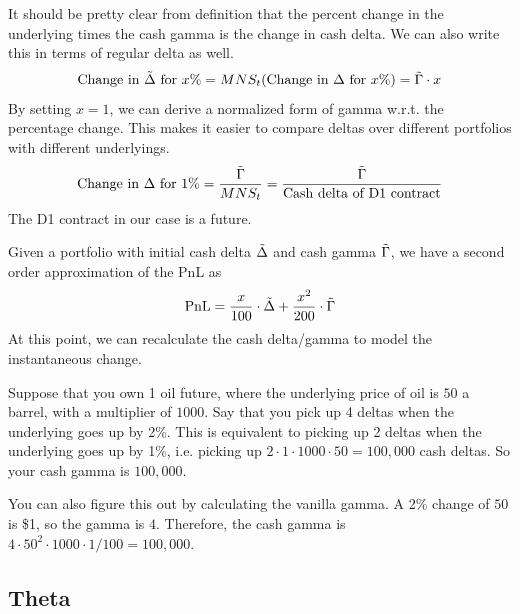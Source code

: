 \documentclass{article}
\begin{document}
    \begin{theorem}
      It should be pretty clear from definition that the percent change in the underlying times the cash gamma is the change in cash delta. We can also write this in terms of regular delta as well. 
      \begin{equation}
        \text{Change in } \Tilde{\Delta} \text{ for } x\% = M N S_t (\text{Change in } \Delta \text{ for } x\%) = \Tilde{\Gamma} \cdot x
      \end{equation}
      By setting $x = 1$, we can derive a normalized form of gamma w.r.t. the percentage change. This makes it easier to compare deltas over different portfolios with different underlyings. 
      \begin{equation}
        \text{Change in } \Delta \text{ for } 1\% = \frac{\Tilde{\Gamma}}{M N S_t} = \frac{\Tilde{\Gamma}}{\text{Cash delta of D1 contract}}
      \end{equation}
      The D1 contract in our case is a future. 
    \end{theorem}

    \begin{theorem}
      Given a portfolio with initial cash delta $\Tilde{\Delta}$ and cash gamma $\Tilde{\Gamma}$, we have a second order approximation of the PnL as
      \begin{equation}
        \mathrm{PnL} = \frac{x}{100} \cdot \Tilde{\Delta} + \frac{x^2}{200} \cdot \Tilde{\Gamma}
      \end{equation}
      At this point, we can recalculate the cash delta/gamma to model the instantaneous change.
    \end{theorem}

    \begin{example}
      Suppose that you own 1 oil future, where the underlying price of oil is $50$ a barrel, with a multiplier of $1000$. Say that you pick up 4 deltas when the underlying goes up by 2\%. This is equivalent to picking up 2 deltas when the underlying goes up by 1\%, i.e. picking up $2 \cdot 1 \cdot 1000 \cdot 50 = 100,000$ cash deltas. So your cash gamma is $100,000$. 

      You can also figure this out by calculating the vanilla gamma. A 2\% change of $50$ is \$1, so the gamma is $4$. Therefore, the cash gamma is $4 \cdot 50^2 \cdot 1000 \cdot 1 / 100 = 100,000$. 
    \end{example}

  \subsection{Theta}
\end{document}

